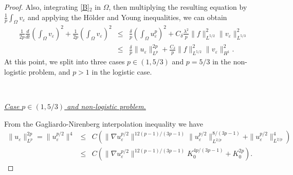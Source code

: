 \documentclass[11pt,reqno]{amsart}%
\numberwithin{equation}{section}
\begin{document}
{\begin{proof}
Also, integrating \eqref{B}$_2$ in $\Omega$, then multiplying the resulting equation by $\frac1p\int_\Omega v_\varepsilon$ and applying the H\"older and Young inequalities, we can obtain
\begin{eqnarray}
\frac{1}{2p}\frac{d}{dt}\left(\int_\Omega v_\varepsilon\right)^2+\frac{1}{2p}\left(\int_\Omega v_\varepsilon\right)^2
&\le&  \frac{\delta}{p}\left(\int_\Omega u_\varepsilon^p\right)^2
+C_\delta \frac{\lambda^2}{p} \|f\|^2_{L^{5/2}} \|v_\varepsilon\|^2_{L^{5/3}}
\nonumber\\
&\le&\frac{\delta}{p}\|u_\varepsilon\|^{2p}_{L^p}
+\frac {C_\delta} p \|f\|^2_{L^{5/2}}\|v_\varepsilon\|^2_{H^1}.\label{B-3}
\end{eqnarray}
At this point, we split into three  cases $p\in (1,5/3)$ and  $p=5/3$ in the non-logistic problem,  and $p>1$ in the logistic case.

\

{\it \underline{Case $p\in (1,5/3)$ and non-logistic problem.}}

From the Gagliardo-Nirenberg interpolation inequality  we have
\begin{equation}\label{B-4}
\begin{array}{rcl}
\|u_\varepsilon\|^{2p}_{L^p}=\|u_\varepsilon^{p/2}\|^4
&\le& C
\left(\|\nabla u_\varepsilon^{p/2}\|^{12(p-1)/(3p-1)}\|u_\varepsilon^{p/2}\|^{8/(3p-1)}_{L^{2/p}}+\|u_\varepsilon^{p/2}\|^4_{L^{2/p}}\right)\\
& \le &
C \left(\|\nabla u_\varepsilon^{p/2}\|^{12(p-1)/(3p-1)} K_0^{4p/(3p-1)} + K_0^{2p}\right).
\end{array}
\end{equation}


\end{proof}}
\end{document}
